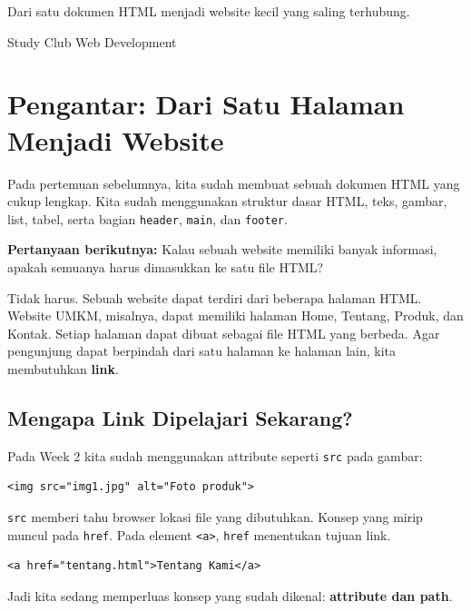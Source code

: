 \documentclass[11pt,a4paper]{article}
\begin{document}
\begin{titlepage}\centering{}\vspace{.7cm}{\Large Meeting 03 — Modul Belajar Pemula\par}\vspace{1.4cm}\begin{tcolorbox}[colback=Light,colframe=Mint,arc=3mm]\centering Dari satu dokumen HTML menjadi website kecil yang saling terhubung.\end{tcolorbox}\vfill{\large Study Club Web Development\par}\end{titlepage}
\tableofcontents\newpage
\section{Pengantar: Dari Satu Halaman Menjadi Website}
Pada pertemuan sebelumnya, kita sudah membuat sebuah dokumen HTML yang cukup lengkap. Kita sudah menggunakan struktur dasar HTML, teks, gambar, list, tabel, serta bagian \texttt{header}, \texttt{main}, dan \texttt{footer}.
\begin{conceptbox}\textbf{Pertanyaan berikutnya:} Kalau sebuah website memiliki banyak informasi, apakah semuanya harus dimasukkan ke satu file HTML?
\end{conceptbox}
Tidak harus. Sebuah website dapat terdiri dari beberapa halaman HTML. Website UMKM, misalnya, dapat memiliki halaman Home, Tentang, Produk, dan Kontak. Setiap halaman dapat dibuat sebagai file HTML yang berbeda.
Agar pengunjung dapat berpindah dari satu halaman ke halaman lain, kita membutuhkan \textbf{link}.
\subsection{Mengapa Link Dipelajari Sekarang?}
Pada Week 2 kita sudah menggunakan attribute seperti \texttt{src} pada gambar:
\begin{lstlisting}[style=htmlstyle]<img src="img1.jpg" alt="Foto produk">\end{lstlisting}
\texttt{src} memberi tahu browser lokasi file yang dibutuhkan. Konsep yang mirip muncul pada \texttt{href}. Pada element \texttt{<a>}, \texttt{href} menentukan tujuan link.
\begin{lstlisting}[style=htmlstyle]<a href="tentang.html">Tentang Kami</a>\end{lstlisting}
Jadi kita sedang memperluas konsep yang sudah dikenal: \textbf{attribute dan path}.
\end{document}
